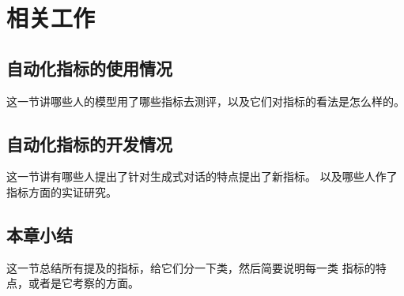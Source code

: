 
\chapter{相关工作}\label{ch:相关工作}
\section{自动化指标的使用情况}
这一节讲哪些人的模型用了哪些指标去测评，以及它们对指标的看法是怎么样的。

\section{自动化指标的开发情况}
这一节讲有哪些人提出了针对生成式对话的特点提出了新指标。
以及哪些人作了指标方面的实证研究。

\section{本章小结}\label{sec:本章小结}
这一节总结所有提及的指标，给它们分一下类，然后简要说明每一类
指标的特点，或者是它考察的方面。
